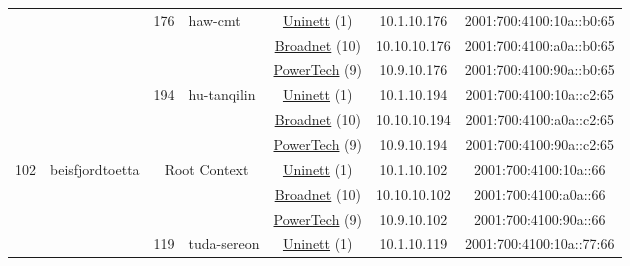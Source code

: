 \begin{small}
\begin{center}
\begin{longtable}{|c|c|c|c|c|c|c|c|}
  &  & \multirow{3}{*}{\tiny{176}} & \multicolumn{1}{|l|}{\multirow{3}{*}{\tiny{haw-cmt}}} & \multicolumn{2}{|c|}{\tiny{\href{https://www.uninett.no}{Uninett} (1)}} & \tiny{10.1.10.176} & \tiny{2001:700:4100:10a::b0:65} \\* \cline{5-5}\cline{6-6}\cline{7-7}\cline{8-8}
  &  &  &  & \multicolumn{2}{|c|}{\tiny{\href{https://www.broadnet.no}{Broadnet} (10)}} & \tiny{10.10.10.176} & \tiny{2001:700:4100:a0a::b0:65} \\* \cline{5-5}\cline{6-6}\cline{7-7}\cline{8-8}
  &  &  &  & \multicolumn{2}{|c|}{\tiny{\href{http://www.powertech.no}{PowerTech} (9)}} & \tiny{10.9.10.176} & \tiny{2001:700:4100:90a::b0:65} \\* \cline{3-3}\cline{4-4}\cline{5-5}\cline{6-6}\cline{7-7}\cline{8-8}
  &  & \multirow{3}{*}{\tiny{194}} & \multicolumn{1}{|l|}{\multirow{3}{*}{\tiny{hu-tanqilin}}} & \multicolumn{2}{|c|}{\tiny{\href{https://www.uninett.no}{Uninett} (1)}} & \tiny{10.1.10.194} & \tiny{2001:700:4100:10a::c2:65} \\* \cline{5-5}\cline{6-6}\cline{7-7}\cline{8-8}
  &  &  &  & \multicolumn{2}{|c|}{\tiny{\href{https://www.broadnet.no}{Broadnet} (10)}} & \tiny{10.10.10.194} & \tiny{2001:700:4100:a0a::c2:65} \\* \cline{5-5}\cline{6-6}\cline{7-7}\cline{8-8}
  &  &  &  & \multicolumn{2}{|c|}{\tiny{\href{http://www.powertech.no}{PowerTech} (9)}} & \tiny{10.9.10.194} & \tiny{2001:700:4100:90a::c2:65} \\ \hline
 \multirow{54}{*}{\tiny{102}} & \multicolumn{1}{|l|}{\multirow{54}{*}{\tiny{beisfjordtoetta}}} & \multicolumn{2}{|c|}{\multirow{3}{*}{\tiny{Root Context}}} & \multicolumn{2}{|c|}{\tiny{\href{https://www.uninett.no}{Uninett} (1)}} & \tiny{10.1.10.102} & \tiny{2001:700:4100:10a::66} \\* \cline{5-5}\cline{6-6}\cline{7-7}\cline{8-8}
  &  & \multicolumn{2}{|c|}{} & \multicolumn{2}{|c|}{\tiny{\href{https://www.broadnet.no}{Broadnet} (10)}} & \tiny{10.10.10.102} & \tiny{2001:700:4100:a0a::66} \\* \cline{5-5}\cline{6-6}\cline{7-7}\cline{8-8}
  &  & \multicolumn{2}{|c|}{} & \multicolumn{2}{|c|}{\tiny{\href{http://www.powertech.no}{PowerTech} (9)}} & \tiny{10.9.10.102} & \tiny{2001:700:4100:90a::66} \\* \cline{3-3}\cline{4-4}\cline{5-5}\cline{6-6}\cline{7-7}\cline{8-8}
  &  & \multirow{3}{*}{\tiny{119}} & \multicolumn{1}{|l|}{\multirow{3}{*}{\tiny{tuda-sereon}}} & \multicolumn{2}{|c|}{\tiny{\href{https://www.uninett.no}{Uninett} (1)}} & \tiny{10.1.10.119} & \tiny{2001:700:4100:10a::77:66} \\* \cline{5-5}\cline{6-6}\cline{7-7}\cline{8-8}

\end{longtable}
\end{center}
\end{small}
